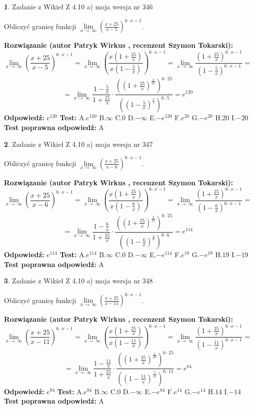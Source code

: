\documentclass[12pt, a4paper]{article}
\theoremstyle{definition} %
\newtheorem{zad}{}
\newcommand{\zadStart}[1]{\begin{zad}#1\newline}
\newcommand{\zadStop}{\end{zad}}
\newcommand{\rozwStart}[2]{\noindent \textbf{Rozwiązanie (autor #1 , recenzent #2): }\newline}
\newcommand{\rozwStop}{\newline}
\newcommand{\odpStart}{\noindent \textbf{Odpowiedź:}\newline}
\newcommand{\odpStop}{\newline}
\newcommand{\testStart}{\noindent \textbf{Test:}\newline}
\newcommand{\testStop}{\newline}
\newcommand{\kluczStart}{\noindent \textbf{Test poprawna odpowiedź:}\newline}
\newcommand{\kluczStop}{\newline}
\begin{document}
\zadStart{Zadanie z Wikieł Z 4.10 a) moja wersja nr 346}

Obliczyć granicę funkcji  $\lim\limits_{x\to\ \infty}(\frac{x+25}{x-5})^{6\cdot x-1}$.
\zadStop
\rozwStart{Patryk Wirkus}{Szymon Tokarski}
$$\lim\limits_{x\to\ \infty}(\frac{x+25}{x-5})^{6\cdot x-1} = \lim\limits_{x\to\ \infty}(\frac{x(1+\frac{25}{x})}{x(1-\frac{5}{x})})^{6\cdot x-1}=\lim\limits_{x\to\ \infty}\frac{(1+\frac{25}{x})^{6\cdot x-1}}{(1-\frac{5}{x})^{6\cdot x-1}}=$$
$$=\lim\limits_{x\to\ \infty}\frac{1-\frac{5}{x}}{1+\frac{25}{x}}\cdot\frac{((1+\frac{25}{x})^{\frac{x}{25}})^{6\cdot25}}{((1-\frac{5}{x})^{\frac{x}{5}})^{6\cdot5}}=e^{120}$$
\rozwStop
\odpStart
$e^{120}$
\odpStop
\testStart
A.$e^{120}$ B.$\infty$ C.$0$ D.$-\infty$ E.$-e^{120}$
F.$e^{20}$ G.$-e^{20}$
H.$20$
I.$-20$
\testStop
\kluczStart
A
\kluczStop



\zadStart{Zadanie z Wikieł Z 4.10 a) moja wersja nr 347}

Obliczyć granicę funkcji  $\lim\limits_{x\to\ \infty}(\frac{x+25}{x-6})^{6\cdot x-1}$.
\zadStop
\rozwStart{Patryk Wirkus}{Szymon Tokarski}
$$\lim\limits_{x\to\ \infty}(\frac{x+25}{x-6})^{6\cdot x-1} = \lim\limits_{x\to\ \infty}(\frac{x(1+\frac{25}{x})}{x(1-\frac{6}{x})})^{6\cdot x-1}=\lim\limits_{x\to\ \infty}\frac{(1+\frac{25}{x})^{6\cdot x-1}}{(1-\frac{6}{x})^{6\cdot x-1}}=$$
$$=\lim\limits_{x\to\ \infty}\frac{1-\frac{6}{x}}{1+\frac{25}{x}}\cdot\frac{((1+\frac{25}{x})^{\frac{x}{25}})^{6\cdot25}}{((1-\frac{6}{x})^{\frac{x}{6}})^{6\cdot6}}=e^{114}$$
\rozwStop
\odpStart
$e^{114}$
\odpStop
\testStart
A.$e^{114}$ B.$\infty$ C.$0$ D.$-\infty$ E.$-e^{114}$
F.$e^{19}$ G.$-e^{19}$
H.$19$
I.$-19$
\testStop
\kluczStart
A
\kluczStop



\zadStart{Zadanie z Wikieł Z 4.10 a) moja wersja nr 348}

Obliczyć granicę funkcji  $\lim\limits_{x\to\ \infty}(\frac{x+25}{x-11})^{6\cdot x-1}$.
\zadStop
\rozwStart{Patryk Wirkus}{Szymon Tokarski}
$$\lim\limits_{x\to\ \infty}(\frac{x+25}{x-11})^{6\cdot x-1} = \lim\limits_{x\to\ \infty}(\frac{x(1+\frac{25}{x})}{x(1-\frac{11}{x})})^{6\cdot x-1}=\lim\limits_{x\to\ \infty}\frac{(1+\frac{25}{x})^{6\cdot x-1}}{(1-\frac{11}{x})^{6\cdot x-1}}=$$
$$=\lim\limits_{x\to\ \infty}\frac{1-\frac{11}{x}}{1+\frac{25}{x}}\cdot\frac{((1+\frac{25}{x})^{\frac{x}{25}})^{6\cdot25}}{((1-\frac{11}{x})^{\frac{x}{11}})^{6\cdot11}}=e^{84}$$
\rozwStop
\odpStart
$e^{84}$
\odpStop
\testStart
A.$e^{84}$ B.$\infty$ C.$0$ D.$-\infty$ E.$-e^{84}$
F.$e^{14}$ G.$-e^{14}$
H.$14$
I.$-14$
\testStop
\kluczStart
A
\kluczStop
\end{document}
